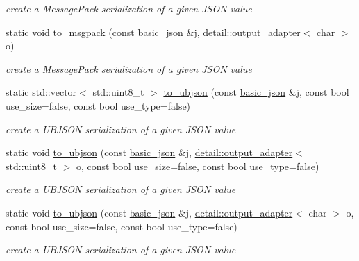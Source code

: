 \begin{DoxyCompactItemize}
\begin{DoxyCompactList}\small\item\em create a Message\+Pack serialization of a given J\+S\+ON value \end{DoxyCompactList}\item 
static void \hyperlink{classnlohmann_1_1basic__json_aca5dc0fca52131f3a634372120abfbe7}{to\+\_\+msgpack} (const \hyperlink{classnlohmann_1_1basic__json}{basic\+\_\+json} \&j, \hyperlink{classnlohmann_1_1detail_1_1output__adapter}{detail\+::output\+\_\+adapter}$<$ char $>$ o)
\begin{DoxyCompactList}\small\item\em create a Message\+Pack serialization of a given J\+S\+ON value \end{DoxyCompactList}\item 
static std\+::vector$<$ std\+::uint8\+\_\+t $>$ \hyperlink{classnlohmann_1_1basic__json_a2c71cbd82dcf82ac92021ddf476e469d}{to\+\_\+ubjson} (const \hyperlink{classnlohmann_1_1basic__json}{basic\+\_\+json} \&j, const bool use\+\_\+size=false, const bool use\+\_\+type=false)
\begin{DoxyCompactList}\small\item\em create a U\+B\+J\+S\+ON serialization of a given J\+S\+ON value \end{DoxyCompactList}\item 
static void \hyperlink{classnlohmann_1_1basic__json_aa9fa5da521622c6c655581840da75090}{to\+\_\+ubjson} (const \hyperlink{classnlohmann_1_1basic__json}{basic\+\_\+json} \&j, \hyperlink{classnlohmann_1_1detail_1_1output__adapter}{detail\+::output\+\_\+adapter}$<$ std\+::uint8\+\_\+t $>$ o, const bool use\+\_\+size=false, const bool use\+\_\+type=false)
\begin{DoxyCompactList}\small\item\em create a U\+B\+J\+S\+ON serialization of a given J\+S\+ON value \end{DoxyCompactList}\item 
static void \hyperlink{classnlohmann_1_1basic__json_a6d133cf7b2e729e9e215edeba5726116}{to\+\_\+ubjson} (const \hyperlink{classnlohmann_1_1basic__json}{basic\+\_\+json} \&j, \hyperlink{classnlohmann_1_1detail_1_1output__adapter}{detail\+::output\+\_\+adapter}$<$ char $>$ o, const bool use\+\_\+size=false, const bool use\+\_\+type=false)
\begin{DoxyCompactList}\small\item\em create a U\+B\+J\+S\+ON serialization of a given J\+S\+ON value \end{DoxyCompactList}\item 

\end{DoxyCompactItemize}
